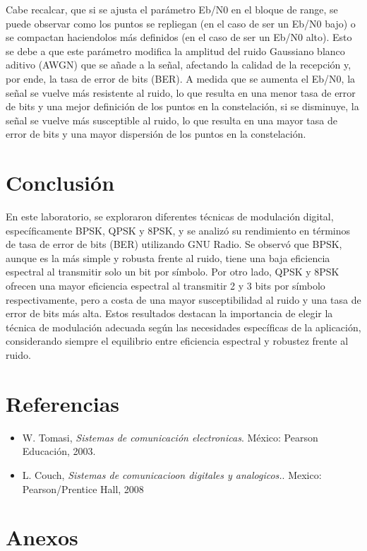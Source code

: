 \documentclass[12pt]{article}
\begin{document}
Cabe recalcar, que si se ajusta el parámetro Eb/N0 en el bloque de range, se puede observar como los puntos se repliegan (en el caso de ser un Eb/N0 bajo) o se compactan haciendolos más definidos (en el caso de ser un Eb/N0 alto). Esto se debe a que este parámetro modifica la amplitud del ruido Gaussiano blanco aditivo (AWGN) que se añade a la señal, afectando la calidad de la recepción y, por ende, la tasa de error de bits (BER). A medida que se aumenta el Eb/N0, la señal se vuelve más resistente al ruido, lo que resulta en una menor tasa de error de bits y una mejor definición de los puntos en la constelación, si se disminuye, la señal se vuelve más susceptible al ruido, lo que resulta en una mayor tasa de error de bits y una mayor dispersión de los puntos en la constelación.

\section{Conclusión}

En este laboratorio, se exploraron diferentes técnicas de modulación digital, específicamente BPSK, QPSK y 8PSK, y se analizó su rendimiento en términos de tasa de error de bits (BER) utilizando GNU Radio. Se observó que BPSK, aunque es la más simple y robusta frente al ruido, tiene una baja eficiencia espectral al transmitir solo un bit por símbolo. Por otro lado, QPSK y 8PSK ofrecen una mayor eficiencia espectral al transmitir 2 y 3 bits por símbolo respectivamente, pero a costa de una mayor susceptibilidad al ruido y una tasa de error de bits más alta. Estos resultados destacan la importancia de elegir la técnica de modulación adecuada según las necesidades específicas de la aplicación, considerando siempre el equilibrio entre eficiencia espectral y robustez frente al ruido.

\newpage
\section{Referencias}

\begin{itemize}
    \item W. Tomasi, \textit{Sistemas de comunicación electronicas}. México: Pearson Educación, 2003.
    \item L. Couch, \textit{Sistemas de comunicacioon digitales y analogicos.}. Mexico: Pearson/Prentice Hall, 2008
\end{itemize}

\newpage
\section{Anexos}
\end{document}
